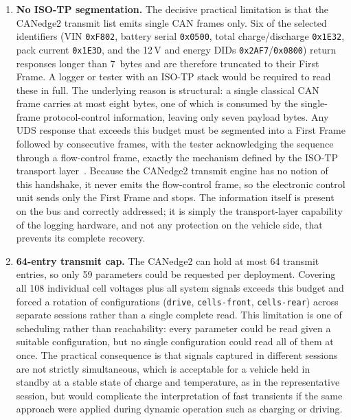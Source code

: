 \documentclass[11pt,a4paper,oneside,parskip=half]{scrreprt}
\providecommand{\hex}{}\renewcommand{\hex}[1]{\texttt{0x#1}}
\begin{document}
\begin{enumerate}
  \item \textbf{No ISO-TP segmentation.} The decisive practical limitation is that the CANedge2 transmit list emits single CAN frames only. Six of the selected identifiers (VIN \hex{F802}, battery serial \hex{0500}, total charge/discharge \hex{1E32}, pack current \hex{1E3D}, and the 12\,V and energy DIDs \hex{2AF7}/\hex{0800}) return responses longer than 7~bytes and are therefore truncated to their First Frame. A logger or tester with an ISO-TP stack would be required to read these in full. The underlying reason is structural: a single classical CAN frame carries at most eight bytes, one of which is consumed by the single-frame protocol-control information, leaving only seven payload bytes. Any UDS response that exceeds this budget must be segmented into a First Frame followed by consecutive frames, with the tester acknowledging the sequence through a flow-control frame, exactly the mechanism defined by the ISO-TP transport layer~\cite{iso15765}. Because the CANedge2 transmit engine has no notion of this handshake, it never emits the flow-control frame, so the electronic control unit sends only the First Frame and stops. The information itself is present on the bus and correctly addressed; it is simply the transport-layer capability of the logging hardware, and not any protection on the vehicle side, that prevents its complete recovery.
  \item \textbf{64-entry transmit cap.} The CANedge2 can hold at most 64 transmit entries, so only 59 parameters could be requested per deployment. Covering all 108 individual cell voltages plus all system signals exceeds this budget and forced a rotation of configurations (\texttt{drive}, \texttt{cells-front}, \texttt{cells-rear}) across separate sessions rather than a single complete read. This limitation is one of scheduling rather than reachability: every parameter could be read given a suitable configuration, but no single configuration could read all of them at once. The practical consequence is that signals captured in different sessions are not strictly simultaneous, which is acceptable for a vehicle held in standby at a stable state of charge and temperature, as in the representative session, but would complicate the interpretation of fast transients if the same approach were applied during dynamic operation such as charging or driving.

\end{enumerate}
\end{document}

